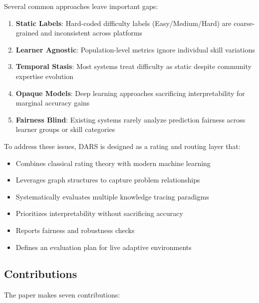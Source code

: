 \documentclass[conference]{IEEEtran}
\begin{document}
Several common approaches leave important gaps:

\begin{enumerate}
    \item \textbf{Static Labels}: Hard-coded difficulty labels (Easy/Medium/Hard) are coarse-grained and inconsistent across platforms
    \item \textbf{Learner Agnostic}: Population-level metrics ignore individual skill variations
    \item \textbf{Temporal Stasis}: Most systems treat difficulty as static despite community expertise evolution
    \item \textbf{Opaque Models}: Deep learning approaches sacrificing interpretability for marginal accuracy gains
    \item \textbf{Fairness Blind}: Existing systems rarely analyze prediction fairness across learner groups or skill categories
\end{enumerate}

To address these issues, DARS is designed as a rating and routing layer that:
\begin{itemize}
    \item Combines classical rating theory with modern machine learning
    \item Leverages graph structures to capture problem relationships
    \item Systematically evaluates multiple knowledge tracing paradigms
    \item Prioritizes interpretability without sacrificing accuracy
    \item Reports fairness and robustness checks
    \item Defines an evaluation plan for live adaptive environments
\end{itemize}

\subsection{Contributions}

The paper makes seven contributions:
\end{document}
